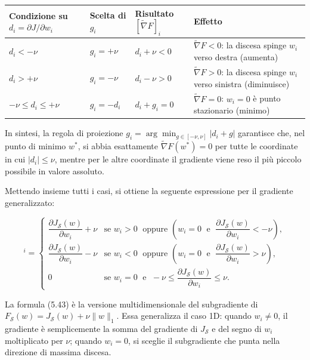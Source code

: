 \documentclass[a4paper,12pt]{article}
\numberwithin{equation}{section}
\numberwithin{figure}{section}
\numberwithin{table}{section}
\begin{document}
{\small
\setlength{\tabcolsep}{4pt}
\renewcommand{\arraystretch}{1.3}
\begin{center}
\begin{tabular}{>{\raggedright\arraybackslash}p{}
                >{\raggedright\arraybackslash}p{}
                >{\raggedright\arraybackslash}p{}
                >{\raggedright\arraybackslash}p{}}
\toprule
\textbf{Condizione su }$d_i = \partial J/\partial w_i$ &
\textbf{Scelta di }$g_i$ &
\textbf{Risultato }$[\widetilde{\nabla}F]_i$ &
\textbf{Effetto} \\
\midrule
$d_i < -\nu$ &
$g_i = +\nu$ &
$d_i + \nu < 0$ &
$\widetilde{\nabla}F < 0$: la discesa spinge $w_i$ verso destra (aumenta) \\
$d_i > +\nu$ &
$g_i = -\nu$ &
$d_i - \nu > 0$ &
$\widetilde{\nabla}F > 0$: la discesa spinge $w_i$ verso sinistra (diminuisce) \\
$-\nu \leq d_i \leq +\nu$ &
$g_i = -d_i$ &
$d_i + g_i = 0$ &
$\widetilde{\nabla}F = 0$: $w_i = 0$ è punto stazionario (minimo) \\
\bottomrule
\end{tabular}
\end{center}
}

In sintesi, la regola di proiezione \(g_i = \arg\min_{g \in [-\nu,\nu]} |d_i + g|\) garantisce che, nel punto di minimo \(w^*\), si abbia esattamente \(\widetilde{\nabla}F(w^*) = 0\) per tutte le coordinate in cui \(|d_i| \le \nu\), mentre per le altre coordinate il gradiente viene reso il più piccolo possibile in valore assoluto.

Mettendo insieme tutti i casi, si ottiene la seguente espressione per il
gradiente generalizzato:

\vspace*{-\baselineskip}
\begin{equation}
[\widetilde{\nabla} F_{\mathcal{S}}(w)]^i =
\begin{cases}
\dfrac{\partial J_{\mathcal{S}}(w)}{\partial w_i} + \nu
& \text{se } w_i > 0 \;\text{ oppure } \left( w_i = 0 \;\text{ e }\; \dfrac{\partial J_{\mathcal{S}}(w)}{\partial w_i} < -\nu \right), \\[12pt]
\dfrac{\partial J_{\mathcal{S}}(w)}{\partial w_i} - \nu
& \text{se } w_i < 0 \;\text{ oppure } \left( w_i = 0 \;\text{ e }\; \dfrac{\partial J_{\mathcal{S}}(w)}{\partial w_i} > \nu \right), \\[12pt]
0
& \text{se } w_i = 0 \;\text{ e }\; -\nu \leq \dfrac{\partial J_{\mathcal{S}}(w)}{\partial w_i} \leq \nu.
\end{cases}
\tag{5.43}
\end{equation}
\vspace*{-\baselineskip}
\begin{notebox}
  La formula (5.43) è la versione multidimensionale del subgradiente di
  $F_{\mathcal{S}}(w) = J_{\mathcal{S}}(w) + \nu\|w\|_1$. Essa generalizza
  il caso 1D: quando $w_i \neq 0$, il gradiente è semplicemente la somma
  del gradiente di $J_{\mathcal{S}}$ e del segno di $w_i$ moltiplicato per $\nu$;
  quando $w_i = 0$, si sceglie il subgradiente che punta nella direzione di
  massima discesa.
\end{notebox}
\end{document}
